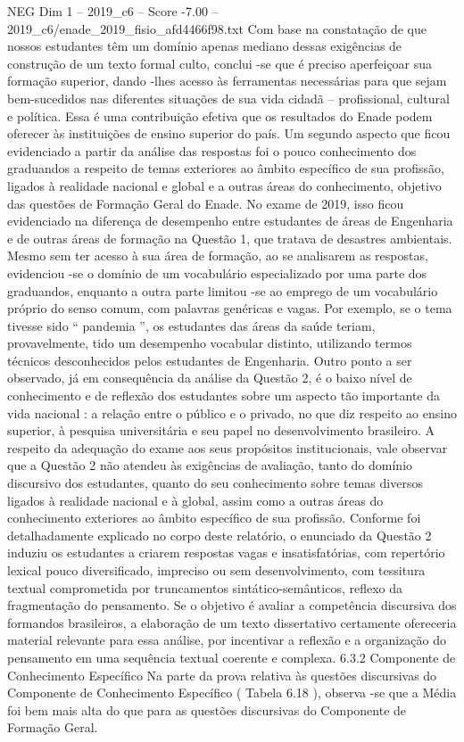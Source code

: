 \begin{textsample}{NEG Dim 1 – 2019\_c6 – Score -7.00 – 2019\_c6/enade\_2019\_fisio\_afd4466f98.txt}
Com base na constatação de que nossos estudantes têm um domínio apenas mediano dessas exigências de construção de um texto formal culto, conclui -se que é preciso aperfeiçoar sua formação superior, dando -lhes acesso às ferramentas necessárias para que sejam bem-sucedidos nas diferentes situações de sua vida cidadã – profissional, cultural e política.
Essa é uma contribuição efetiva que os resultados do Enade podem oferecer às instituições de ensino superior do país.
Um segundo aspecto que ficou evidenciado a partir da análise das respostas foi o pouco conhecimento dos graduandos a respeito de temas exteriores ao âmbito específico de sua profissão, ligados à realidade nacional e global e a outras áreas do conhecimento, objetivo das questões de Formação Geral do Enade.
No exame de 2019, isso ficou evidenciado na diferença de desempenho entre estudantes de áreas de Engenharia e de outras áreas de formação na Questão 1, que tratava de desastres ambientais.
Mesmo sem ter acesso à sua área de formação, ao se analisarem as respostas, evidenciou -se o domínio de um vocabulário especializado por uma parte dos graduandos, enquanto a outra parte limitou -se ao emprego de um vocabulário próprio do senso comum, com palavras genéricas e vagas.
Por exemplo, se o tema tivesse sido “ pandemia ”, os estudantes das áreas da saúde teriam, provavelmente, tido um desempenho vocabular distinto, utilizando termos técnicos desconhecidos pelos estudantes de Engenharia.
Outro ponto a ser observado, já em consequência da análise da Questão 2, é o baixo nível de conhecimento e de reflexão dos estudantes sobre um aspecto tão importante da vida nacional : a relação entre o público e o privado, no que diz respeito ao ensino superior, à pesquisa universitária e seu papel no desenvolvimento brasileiro.
A respeito da adequação do exame aos seus propósitos institucionais, vale observar que a Questão 2 não atendeu às exigências de avaliação, tanto do domínio discursivo dos estudantes, quanto do seu conhecimento sobre temas diversos ligados à realidade nacional e à global, assim como a outras áreas do conhecimento exteriores ao âmbito específico de sua profissão.
Conforme foi detalhadamente explicado no corpo deste relatório, o enunciado da Questão 2 induziu os estudantes a criarem respostas vagas e insatisfatórias, com repertório lexical pouco diversificado, impreciso ou sem desenvolvimento, com tessitura textual comprometida por truncamentos sintático-semânticos, reflexo da fragmentação do pensamento.
Se o objetivo é avaliar a competência discursiva dos formandos brasileiros, a elaboração de um texto dissertativo certamente ofereceria material relevante para essa análise, por incentivar a reflexão e a organização do pensamento em uma sequência textual coerente e complexa. 6.3.2 Componente de Conhecimento Específico Na parte da prova relativa às questões discursivas do Componente de Conhecimento Específico ( Tabela 6.18 ), observa -se que a Média foi bem mais alta do que para as questões discursivas do Componente de Formação Geral.

\end{textsample}

